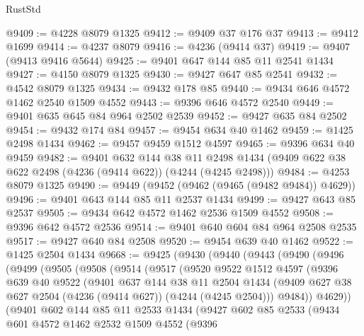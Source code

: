 \begin{lexlean}{RustStd}
\begin{coremodule}
@9409 := @4228 @8079 @1325
@9412 := @9409 @37 @176 @37
@9413 := @9412 @1699
@9414 := @4237 @8079
@9416 := @4236 (@9414 @37)
@9419 := @9407 (@9413 @9416 @5644)
@9425 := @9401 @647 @144 @85 @11 @2541 @1434
@9427 := @4150 @8079 @1325
@9430 := @9427 @647 @85 @2541
@9432 := @4542 @8079 @1325
@9434 := @9432 @178 @85
@9440 := @9434 @646 @4572 @1462 @2540 @1509 @4552
@9443 := @9396 @646 @4572 @2540
@9449 := @9401 @635 @645 @84 @964 @2502 @2539
@9452 := @9427 @635 @84 @2502
@9454 := @9432 @174 @84
@9457 := @9454 @634 @40 @1462
@9459 := @1425 @2498 @1434
@9462 := @9457 @9459 @1512 @4597
@9465 := @9396 @634 @40 @9459
@9482 := @9401
    @632
    @144
    @38
    @11
    @2498
    @1434
    (@9409 @622 @38 @622 @2498 (@4236 (@9414 @622)) (@4244 (@4245 @2498)))
@9484 := @4253 @8079 @1325
@9490 := @9449 (@9452 (@9462 (@9465 (@9482 @9484)) @4629))
@9496 := @9401 @643 @144 @85 @11 @2537 @1434
@9499 := @9427 @643 @85 @2537
@9505 := @9434 @642 @4572 @1462 @2536 @1509 @4552
@9508 := @9396 @642 @4572 @2536
@9514 := @9401 @640 @604 @84 @964 @2508 @2535
@9517 := @9427 @640 @84 @2508
@9520 := @9454 @639 @40 @1462
@9522 := @1425 @2504 @1434
@9668 := @9425
    (@9430
      (@9440
        (@9443
          (@9490
            (@9496
              (@9499
                (@9505
                  (@9508
                    (@9514
                      (@9517
                        (@9520
                          @9522
                          @1512
                          @4597
                          (@9396
                            @639
                            @40
                            @9522
                            (@9401
                              @637
                              @144
                              @38
                              @11
                              @2504
                              @1434
                              (@9409 @627 @38 @627 @2504 (@4236 (@9414 @627)) (@4244 (@4245 @2504)))
                              @9484))
                          @4629))
                      (@9401
                        @602
                        @144
                        @85
                        @11
                        @2533
                        @1434
                        (@9427
                          @602
                          @85
                          @2533
                          (@9434
                            @601
                            @4572
                            @1462
                            @2532
                            @1509
                            @4552
                            (@9396

\end{coremodule}
\end{lexlean}
